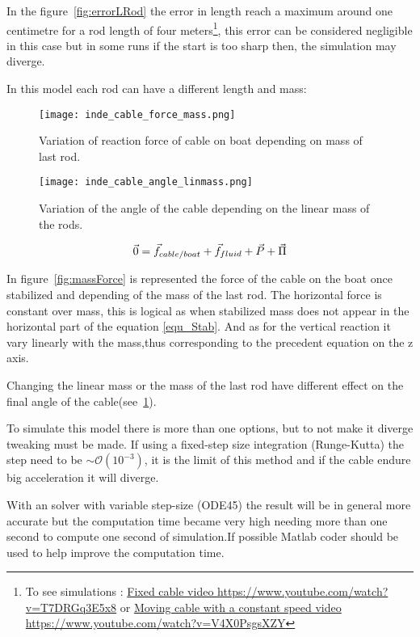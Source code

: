 In the figure~\ref{fig:errorLRod} the error in length reach a maximum around one centimetre for a rod length of four meters\footnote{To see simulations : \href{https://www.youtube.com/watch?v=T7DRGq3E5x8}{Fixed cable video https://www.youtube.com/watch?v=T7DRGq3E5x8} or \href{https://www.youtube.com/watch?v=V4X0PsgsXZY}{Moving cable with a constant speed video https://www.youtube.com/watch?v=V4X0PsgsXZY}}, this error can be considered negligible in this case but in some runs if the start is too sharp then, the simulation may diverge.

In this model each rod can have a different length and mass:


\begin{figure}[H]
\centering
    \begin{minipage}[b]{0.4\textwidth}
    \centering
    \texttt{[image: inde\_cable\_force\_mass.png]}
    \caption{Variation of reaction force of cable on boat depending on mass of last rod.}
    \label{fig:massForce}
    \end{minipage}
    \hfill
    \begin{minipage}[b]{0.45\textwidth}
    \centering
    \texttt{[image: inde\_cable\_angle\_linmass.png]}
    \caption{Variation of the angle of the cable depending on the linear mass of the rods.}
    \label{fig:linmassAngle}
    \end{minipage}
\end{figure}

\begin{equation}
 \vec{0} = \vec{f}_{cable/boat}+\vec{f}_{fluid}+\vec{P}+\vec{\Pi}\\
 \label{equ_Stab}
\end{equation}

In figure~\ref{fig:massForce} is represented the force of the cable on the boat once stabilized and depending of the mass of the last rod. The horizontal force is constant over mass, this is logical as when stabilized mass does not appear in the horizontal part of the equation \eqref{equ_Stab}. And as for the vertical reaction it vary linearly with the mass,thus corresponding to the precedent equation on the z axis.

Changing the linear mass or the mass of the last rod have different effect on the final angle of the cable(see~\ref{fig:linmassAngle}).


To simulate this model there is more than one options, but to not make it diverge tweaking must be made.
If using a fixed-step size integration (Runge-Kutta) the step need to be $\sim\mathcal{O}(10^{-3})$, it is the limit of this method and if the cable endure big acceleration it will diverge.

With an solver with variable step-size (ODE45) the result will be in general more accurate but the computation time became very high needing more than one second to compute one second of simulation.If possible Matlab coder should be used to help improve the computation time.

